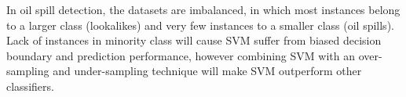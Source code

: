 



In oil spill detection, the datasets are imbalanced, in which most instances belong to a larger class (lookalikes) and very few instances to a smaller class (oil spills). Lack of instances in minority class will cause SVM suffer from biased decision boundary and prediction performance, however combining SVM with an over-sampling and under-sampling technique will make SVM outperform other classifiers\cite{liu2006boosting}.



